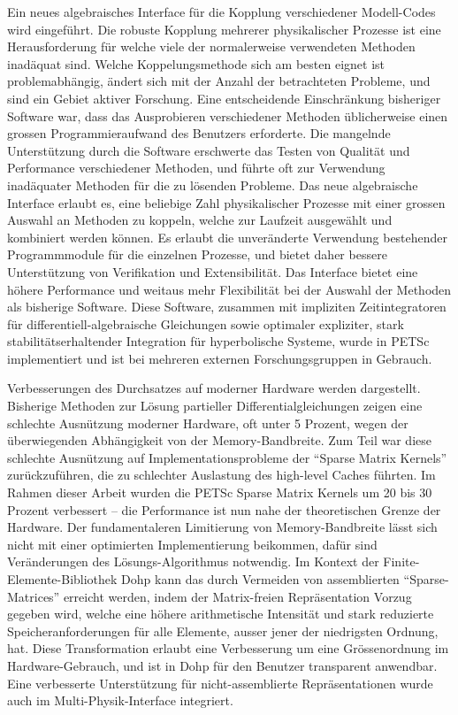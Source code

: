 Ein neues algebraisches Interface für die Kopplung verschiedener Modell-Codes
wird eingeführt.  Die robuste Kopplung mehrerer physikalischer Prozesse ist
eine Herausforderung für welche viele der normalerweise verwendeten Methoden
inadäquat sind.  Welche Koppelungsmethode sich am besten eignet ist
problemabhängig, ändert sich mit der Anzahl der betrachteten Probleme, und
sind ein Gebiet aktiver Forschung.  Eine entscheidende Einschränkung
bisheriger Software war, dass das Ausprobieren verschiedener Methoden
üblicherweise einen grossen Programmieraufwand des Benutzers erforderte.  Die
mangelnde Unterstützung durch die Software erschwerte das Testen von Qualität
und Performance verschiedener Methoden, und führte oft zur Verwendung
inadäquater Methoden für die zu lösenden Probleme.  Das neue algebraische
Interface erlaubt es, eine beliebige Zahl physikalischer Prozesse mit einer
grossen Auswahl an Methoden zu koppeln, welche zur Laufzeit ausgewählt und
kombiniert werden können.  Es erlaubt die unveränderte Verwendung bestehender
Programmmodule für die einzelnen Prozesse, und bietet daher bessere
Unterstützung von Verifikation und Extensibilität.  Das Interface bietet eine
höhere Performance und weitaus mehr Flexibilität bei der Auswahl der Methoden
als bisherige Software.  Diese Software, zusammen mit impliziten
Zeitintegratoren für differentiell-algebraische Gleichungen sowie optimaler
expliziter, stark stabilitätserhaltender Integration für hyperbolische
Systeme, wurde in PETSc implementiert und ist bei mehreren externen
Forschungsgruppen in Gebrauch.

Verbesserungen des Durchsatzes auf moderner Hardware werden
dargestellt. Bisherige Methoden zur Lösung partieller Differentialgleichungen
zeigen eine schlechte Ausnützung moderner Hardware, oft unter 5 Prozent, wegen
der überwiegenden Abhängigkeit von der Memory-Bandbreite.  Zum Teil war diese
schlechte Ausnützung auf Implementationsprobleme der ``Sparse Matrix Kernels''
zurückzuführen, die zu schlechter Auslastung des high-level Caches führten.
Im Rahmen dieser Arbeit wurden die PETSc Sparse Matrix Kernels um 20 bis 30
Prozent verbessert -- die Performance ist nun nahe der theoretischen Grenze
der Hardware.  Der fundamentaleren Limitierung von Memory-Bandbreite lässt
sich nicht mit einer optimierten Implementierung beikommen, dafür sind
Veränderungen des Lösungs-Algorithmus notwendig.  Im Kontext der
Finite-Elemente-Bibliothek Dohp kann das durch Vermeiden von assemblierten
``Sparse-Matrices'' erreicht werden, indem der Matrix-freien Repräsentation
Vorzug gegeben wird, welche eine höhere arithmetische Intensität und stark
reduzierte Speicheranforderungen für alle Elemente, ausser jener der
niedrigsten Ordnung, hat.  Diese Transformation erlaubt eine Verbesserung um
eine Grössenordnung im Hardware-Gebrauch, und ist in Dohp für den Benutzer
transparent anwendbar.  Eine verbesserte Unterstützung für nicht-assemblierte
Repräsentationen wurde auch im Multi-Physik-Interface integriert.

